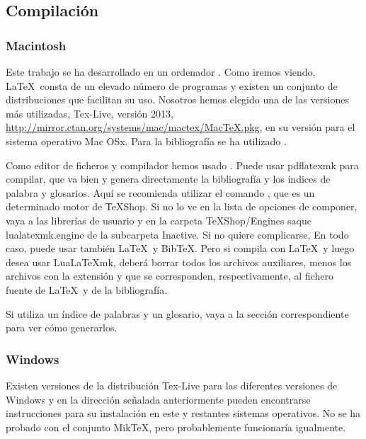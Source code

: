 \subsection{Compilación}

\subsubsection{{Macintosh}\tsp{\textregistered}}
Este trabajo se ha desarrollado en un ordenador \tsp{\textregistered}. Como iremos viendo, \LaTeX\ consta de un elevado número de programas y existen un conjunto de distribuciones que facilitan su uso. Nosotros hemos elegido una de las versiones más utilizadas, Tex-Live, versión 2013, \url{http://mirror.ctan.org/systems/mac/mactex/MacTeX.pkg}, en su versión para el sistema operativo Mac OSx\tsp{\textregistered}. Para la bibliografía  se ha utilizado . 

Como editor de ficheros y compilador hemos usado \tsp{\textregistered}. Puede usar pdflatexmk para
compilar, que va bien y genera directamente la bibliografía y los índices de palabra y glosarios. Aquí se recomienda
utilizar el comando , que es un determinado motor  de TeXShop\tsp{\textregistered}. Si
no lo ve en la lista de opciones de componer, vaya a las librerías de usuario y en la carpeta TeXShop/Engines saque
lualatexmk.engine de la subcarpeta Inactive. Si no quiere complicarse,  En todo caso, puede usar también \LaTeX\ y
BibTeX. Pero si compila con \LaTeX\ y luego desea usar Lua\LaTeX mk, deberá borrar todos los archivos auxiliares, menos
los archivos con la extensión  y  que se corresponden, respectivamente, al fichero fuente de
\LaTeX\ y de la bibliografía. 

Si utiliza un índice de palabras y un glosario, vaya a la sección correspondiente para ver cómo generarlos.

\subsubsection{Windows\tsp{\textregistered}}

Existen versiones de la distribución Tex-Live para las diferentes versiones de Windows\tsp{\textregistered} y en la dirección señalada anteriormente pueden encontrarse instrucciones para su instalación en este y restantes sistemas operativos. No se ha probado con el conjunto MikTeX, pero probablemente funcionaría igualmente.

